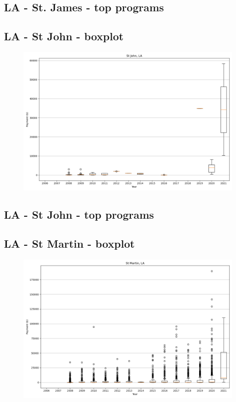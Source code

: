 \subsection*{LA - St. James - top programs}

\newpage
\subsection*{LA - St John - boxplot}
\begin{figure}[h]
\centering
\includegraphics[width=7in]{../output/boxplots/counties/St John-LA_boxplot.png}
\end{figure}


\subsection*{LA - St John - top programs}

\newpage
\subsection*{LA - St Martin - boxplot}
\begin{figure}[h]
\centering
\includegraphics[width=7in]{../output/boxplots/counties/St Martin-LA_boxplot.png}
\end{figure}



